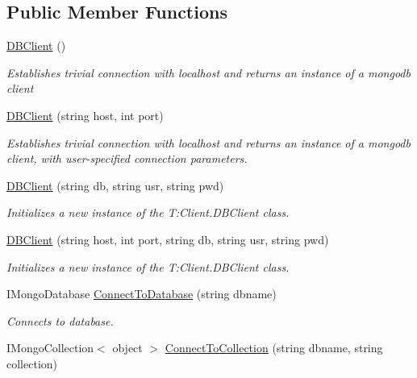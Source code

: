\subsection*{Public Member Functions}
\begin{DoxyCompactItemize}
\item 
\hyperlink{class_client_1_1_d_b_client_a522d138a4a6e287d6e0f4a4e785fc1f6}{D\+B\+Client} ()
\begin{DoxyCompactList}\small\item\em Establishes trivial connection with localhost and returns an instance of a mongodb client \end{DoxyCompactList}\item 
\hyperlink{class_client_1_1_d_b_client_add46a7470fa6c5f9ecf32339428daec5}{D\+B\+Client} (string host, int port)
\begin{DoxyCompactList}\small\item\em Establishes trivial connection with localhost and returns an instance of a mongodb client, with user-\/specified connection parameters. \end{DoxyCompactList}\item 
\hyperlink{class_client_1_1_d_b_client_a2f1223816b5516c8efa71a0ce1f057a7}{D\+B\+Client} (string db, string usr, string pwd)
\begin{DoxyCompactList}\small\item\em Initializes a new instance of the T\+:\+Client.\+D\+B\+Client class. \end{DoxyCompactList}\item 
\hyperlink{class_client_1_1_d_b_client_a69fcdf1545a5cc69b10cba2c5fc51ef2}{D\+B\+Client} (string host, int port, string db, string usr, string pwd)
\begin{DoxyCompactList}\small\item\em Initializes a new instance of the T\+:\+Client.\+D\+B\+Client class. \end{DoxyCompactList}\item 
I\+Mongo\+Database \hyperlink{class_client_1_1_d_b_client_a3e0c25b2cc7d18bc3c5b0ab48f5ce2ea}{Connect\+To\+Database} (string dbname)
\begin{DoxyCompactList}\small\item\em Connects to database. \end{DoxyCompactList}\item 
I\+Mongo\+Collection$<$ object $>$ \hyperlink{class_client_1_1_d_b_client_a527a51d47e38a6290982bb3162e599fe}{Connect\+To\+Collection} (string dbname, string collection)

\end{DoxyCompactItemize}
